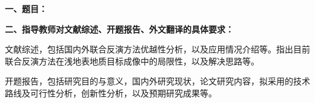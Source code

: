 {
    \setlength{\parindent}{0em}
    \par {\bfseries 一、题目：\Title}
    \\
    \par {\bfseries 二、指导教师对文献综述、开题报告、外文翻译的具体要求：}
}
文献综述，包括国内外联合反演方法优越性分析，以及应用情况介绍等。指出目前联合反演方法在浅地表地质目标成像中的局限性，以及解决思路等。

开题报告，包括研究目的与意义，国内外研究现状，论文研究内容，拟采用的技术路线及可行性分析，创新性分析，以及预期研究成果等。
\mbox{} \vfill

\signature{指导教师（签名）}
